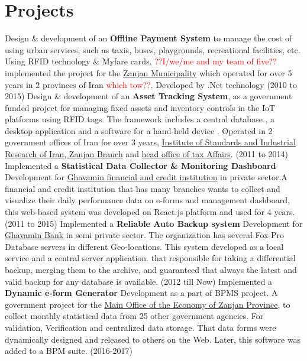 \documentclass[10pt,a4paper,sans]{moderncv} %
\begin{document}
	\section{Projects}
        \cvitem{$\bullet$}
        {
            Design \& development of an \textbf{Offline Payment System} to manage the cost of using urban services, such as taxis, buses, playgrounds, recreational facilities, etc. Using RFID technology \& Myfare cards, \textcolor{red}{??I/we/me and my team of five??} implemented the project for the \href{https://www.zanjan.ir/}{Zanjan Municipality} which operated for over 5 years in 2 provinces of Iran \textcolor{red}{which tow??}. Developed by .Net technology (2010 to 2015)
        }
        \cvitem{$\bullet$}
        {
            Design \& development of an \textbf{Asset Tracking System}, as a government funded project for managing fixed assets and inventory controls in the IoT platforms using RFID tags. The framework includes a central database , a desktop application  and a software for a hand-held device . Operated in 2 government offices of Iran for over 3 years, \href{http://zanjan.isiri.gov.ir/Portal/Home/}{Institute of Standards and Industrial Research of Iran, Zanjan Branch} and \href{http://www.intamedia.ir/Pages/Action/Province/tax29}{head office of tax Affairs}. (2011 to 2014)
        }
        \cvitem{$\bullet$}
        {
            Implemented a \textbf{Statistical Data Collector \& Monitoring Dashboard} Development for \href{https://www.ghbi.ir/fa/}{Ghavamin  financial and credit institution} in private sector.A financial and credit institution that has many branches wants to collect and visualize their daily performance data on e-forms and management dashboard, this web-based system was developed on React.js platform and used for 4 years. (2011 to 2015)
        }
        \cvitem{$\bullet$}
        {
            Implemented a \textbf{Reliable Auto Backup system} Development for \href{https://www.ghbi.ir/fa/}{Ghavamin Bank} in semi private sector. The organization has several Fox-Pro Database servers in different Geo-locations. This system developed as a local service and a central server application. that responsible for taking a differential backup, merging them to the archive, and guaranteed that always the latest and valid backup for any database is available. (2012 till Now)
        }
        \cvitem{$\bullet$}
        {
            Implemented a \textbf{Dynamic e-form Generator} Development as a part of BPMS project. A government project for the \href{http://zn.mefa.ir/}{Main Office of the Economy of Zanjan Province}, to collect monthly statistical data from 25 other government agencies. For validation, Verification and centralized data storage. That data forms were dynamically designed and released to others on the Web. Later, this software was added to a BPM suite. (2016-2017)
        }
\end{document}
